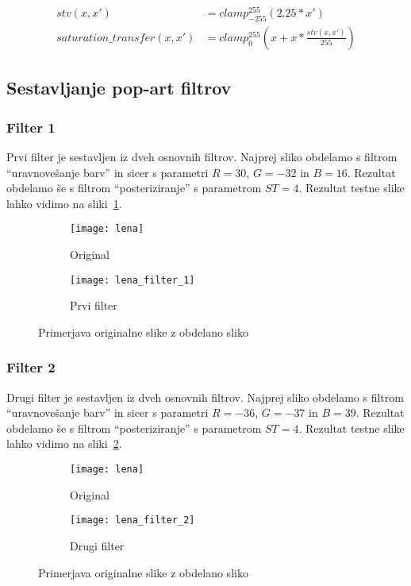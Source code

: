 \begin{align}
stv(x, x') &= clamp_{-255}^{255}(2.25 * x') \nonumber \\
saturation\_transfer(x, x') &= clamp_{0}^{255}(x + x * \frac{stv(x, x')}{255})
\end{align}

\subsection{Sestavljanje pop-art filtrov}

\subsubsection*{Filter 1}
Prvi filter je sestavljen iz dveh osnovnih filtrov. Najprej sliko obdelamo s
filtrom ``uravnovešanje barv'' in sicer s parametri $R = 30$, $G = -32$ in
$B = 16$. Rezultat obdelamo še s filtrom ``posteriziranje'' s parametrom
$ST =4$. Rezultat testne slike lahko vidimo na sliki~\ref{fig:lena_filter_1}.

\begin{figure}[!ht]
    \centering
    \begin{subfigure}[b]{0.4\textwidth}
        \texttt{[image: lena]}
        \caption{Original}
    \end{subfigure}
    \begin{subfigure}[b]{0.4\textwidth}
        \texttt{[image: lena\_filter\_1]}
        \caption{Prvi filter}
    \end{subfigure}
    \caption{Primerjava originalne slike z obdelano sliko}
    \label{fig:lena_filter_1}
\end{figure}


\subsubsection*{Filter 2}
Drugi filter je sestavljen iz dveh osnovnih filtrov. Najprej sliko obdelamo s
filtrom ``uravnovešanje barv'' in sicer s parametri $R = -36$, $G = -37$ in
$B = 39$. Rezultat obdelamo še s filtrom ``posteriziranje'' s parametrom
$ST = 4$. Rezultat testne slike lahko vidimo na sliki~\ref{fig:lena_filter_2}.

\begin{figure}[!ht]
    \centering
    \begin{subfigure}[b]{0.4\textwidth}
        \texttt{[image: lena]}
        \caption{Original}
    \end{subfigure}
    \begin{subfigure}[b]{0.4\textwidth}
        \texttt{[image: lena\_filter\_2]}
        \caption{Drugi filter}
    \end{subfigure}
    \caption{Primerjava originalne slike z obdelano sliko}
    \label{fig:lena_filter_2}
\end{figure}


